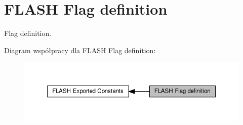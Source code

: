 \hypertarget{group___f_l_a_s_h___flag__definition}{}\section{F\+L\+A\+SH Flag definition}
\label{group___f_l_a_s_h___flag__definition}


Flag definition.  


Diagram współpracy dla F\+L\+A\+SH Flag definition\+:\nopagebreak
\begin{figure}[H]
\begin{center}
\leavevmode
\includegraphics[width=350pt]{group___f_l_a_s_h___flag__definition}
\end{center}
\end{figure}
